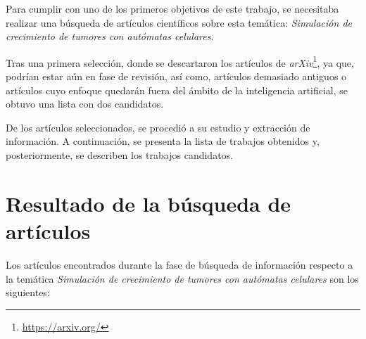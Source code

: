 Para cumplir con uno de los primeros objetivos de este trabajo, se necesitaba
realizar una búsqueda de artículos científicos sobre esta temática:
\textit{Simulación de crecimiento de tumores con autómatas celulares}.

Tras una primera selección, donde se descartaron los artículos de \textit{arXiv}\footnote{\url{https://arxiv.org/}},
ya que, podrían estar aún en fase de revisión, así como, artículos demasiado antiguos o artículos
cuyo enfoque quedarán fuera del ámbito de la inteligencia artificial, se obtuvo una lista
con dos candidatos.

De los artículos seleccionados, se procedió a su estudio y extracción de información. A continuación,
se presenta la lista de trabajos obtenidos y, posteriormente, se describen los trabajos candidatos.

\section{Resultado de la búsqueda de artículos}

Los artículos encontrados durante la fase de búsqueda de información respecto a la temática
\textit{Simulación de crecimiento de tumores con autómatas celulares} son los siguientes:

